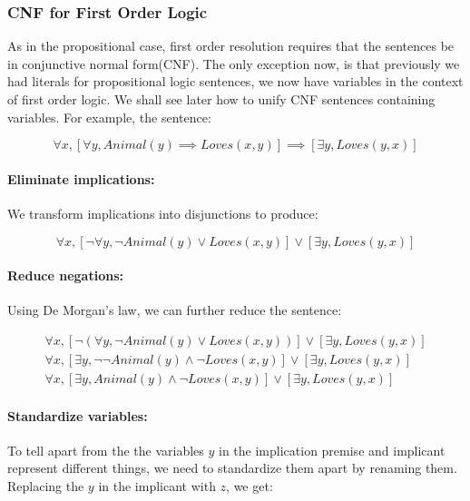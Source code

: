 \documentclass[12pt]{article}
\begin{document}
\subsubsection{CNF for First Order Logic}

As in the propositional case, first order resolution requires that the sentences be in conjunctive normal form(CNF). The only exception now, is that previously we had literals for propositional logic sentences, we now have variables in the context of first order logic. We shall see later how to unify CNF sentences containing variables. For example, the sentence:

\begin{equation*}
\forall x, [\forall y, Animal(y) \implies Loves(x, y)] \implies [\exists y, Loves(y, x)]
\end{equation*}

\paragraph{Eliminate implications:}
We transform implications into disjunctions to produce:

\begin{equation*}
\forall x, [\lnot \forall y, \lnot Animal(y) \lor Loves(x, y)] \lor [\exists y, Loves(y, x)]
\end{equation*}

\paragraph{Reduce negations:}
Using De Morgan's law, we can further reduce the sentence:

\begin{equation*}
\begin{gathered}
\forall x, [\lnot (\forall y, \lnot Animal(y) \lor Loves(x, y))] \lor [\exists y, Loves(y, x)]\\
\forall x, [\exists y, \lnot \lnot Animal(y) \land \lnot Loves(x, y)] \lor [\exists y, Loves(y, x)]\\
\forall x, [\exists y, Animal(y) \land \lnot Loves(x, y)] \lor [\exists y, Loves(y, x)]
\end{gathered}
\end{equation*}

\paragraph{Standardize variables:} 
To tell apart from the the variables $y$ in the implication premise and implicant represent different things, we need to standardize them apart by renaming them. Replacing the $y$ in the implicant with $z$, we get:
\end{document}
